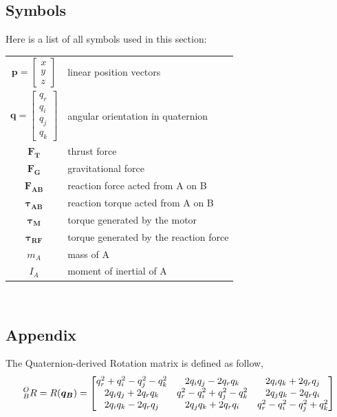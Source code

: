 \subsection{Symbols}
Here is a list of all symbols used in this section:
\\
\begin{tabular}{c p{}}
  $\bm{p} = \begin{bmatrix}x \\ y \\ z \end{bmatrix}$ & linear position vectors \\
  $\bm{q} = \begin{bmatrix} q_r \\ q_i \\ q_j \\ q_k \end{bmatrix}$ & angular orientation in quaternion \\
  $\bm{F_{T}}$ & thrust force \\
  $\bm{F_{G}}$ & gravitational force \\  
  $\bm{F_{AB}}$ & reaction force acted from A on B \\
  $\bm{\tau_{AB}}$ & reaction torque acted from A on B \\
  $\bm{\tau_{M}}$ & torque generated by the motor \\
  $\bm{\tau_{RF}}$ & torque generated by the reaction force \\  
  $m_A$ & mass of A \\
  $I_A$ & moment of inertial of A \\
\end{tabular}\\
\subsection{Appendix}
The Quaternion-derived Rotation matrix is defined as follow,
\begin{align*}
  \prescript{O}{B}{R} = R(\bm{q_B}) =
  \begin{bmatrix}
    q_r^2 + q_i^2 - q_j^2 - q_k^2 & 2q_iq_j - 2q_rq_k & 2q_iq_k + 2q_rq_j \\
    2q_iq_j + 2q_rq_k & q_r^2 - q_i^2 + q_j^2 - q_k^2 & 2q_jq_k - 2q_rq_i \\
    2q_iq_k - 2q_rq_j & 2q_jq_k + 2q_rq_i & q_r^2 - q_i^2 - q_j^2 +q_k^2
  \end{bmatrix}
\end{align*}


